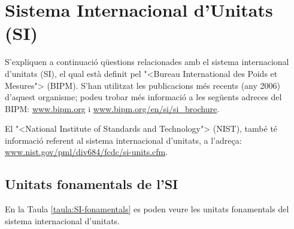 \chapter{Sistema Internacional d'Unitats (SI)} 

S'expliquen a continuaci\'{o} q\"{u}estions relacionades amb el sistema
internacional d'unitats (SI), el qual est\`{a} definit pel {"<}Bureau
International des Poids et Mesures{">} (\textsf{BIPM}). S'han utilitzat les publicacions m\'{e}s recents (any 2006) d'aquest organisme; podeu trobar m\'{e}s informaci\'{o} a les seg\"{u}ents adreces del \textsf{BIPM}: \href{http://www.bipm.org/}{www.bipm.org} i
\href{http://www.bipm.org/en/si/si_brochure/}{www.bipm.org/en/si/si\_brochure}.

El {"<}National Institute of Standards and Technology{">} (\textsf{NIST}), tamb\'{e} t\'{e} informaci\'{o} referent al sistema
internacional d'unitats, a l'adre\c{c}a: \href{http://www.nist.gov/pml/div684/fcdc/si-units.cfm}{www.nist.gov/pml/div684/fcdc/si-units.cfm}.

\section{Unitats fonamentals de l'SI}

En la Taula \vref{taula:SI-fonamentals} es poden veure les unitats
fonamentals del sistema internacional d'unitats.

\vspace{1cm}

